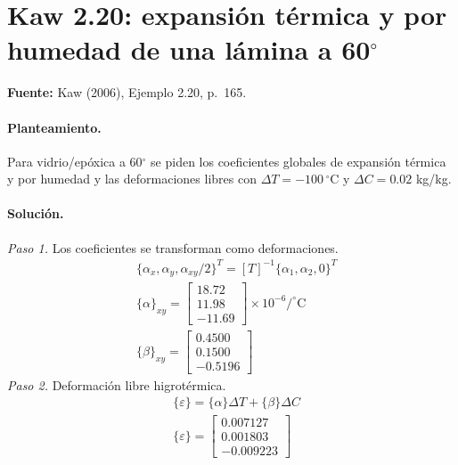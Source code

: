 \documentclass[11pt]{article}
\begin{document}
\clearpage
\section{Kaw 2.20: expansión térmica y por humedad de una lámina a 60\ensuremath{^\circ}}\label{ej:kaw_2_20}
\textbf{Fuente:} Kaw (2006), Ejemplo 2.20, p.~165.

\paragraph{Planteamiento.} Para vidrio/epóxica a 60\ensuremath{^\circ} se piden los coeficientes globales de expansión térmica y por humedad y las deformaciones libres con $\Delta T=-100\,^\circ$C y $\Delta C=0.02$ kg/kg.

\paragraph{Solución.}
\textit{Paso 1.} Los coeficientes se transforman como deformaciones.
\begin{align*}
&\{\alpha_x,\alpha_y,\alpha_{xy}/2\}^T=[T]^{-1}\{\alpha_1,\alpha_2,0\}^T \\
&\{\alpha\}_{xy}=\begin{bmatrix}18.72 \\ 11.98 \\ -11.69\end{bmatrix}\times10^{-6}/^\circ\mathrm{C} \\
&\{\beta\}_{xy}=\begin{bmatrix}0.4500 \\ 0.1500 \\ -0.5196\end{bmatrix}
\end{align*}
\textit{Paso 2.} Deformación libre higrotérmica.
\begin{align*}
&\{\varepsilon\}=\{\alpha\}\Delta T+\{\beta\}\Delta C \\
&\{\varepsilon\}=\begin{bmatrix}0.007127 \\ 0.001803 \\ -0.009223\end{bmatrix}
\end{align*}
\end{document}
